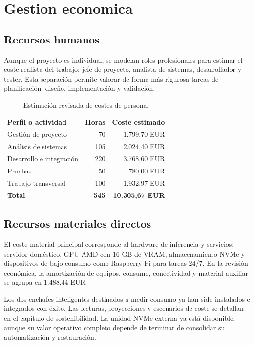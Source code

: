 \chapter{Gestion economica}

\section{Recursos humanos}
Aunque el proyecto es individual, se modelan roles profesionales para estimar el coste realista del trabajo: jefe de proyecto, analista de sistemas, desarrollador y tester. Esta separación permite valorar de forma más rigurosa tareas de planificación, diseño, implementación y validación.

\begin{table}[H]
  \centering
  \caption{Estimación revisada de costes de personal}
  \label{tab:costes-personal}
  \begin{tabular}{lrr}
    \toprule
    Perfil o actividad & Horas & Coste estimado \\
    \midrule
    Gestión de proyecto & 70 & 1.799,70 EUR \\
    Análisis de sistemas & 105 & 2.024,40 EUR \\
    Desarrollo e integración & 220 & 3.768,60 EUR \\
    Pruebas & 50 & 780,00 EUR \\
    Trabajo transversal & 100 & 1.932,97 EUR \\
    \midrule
    \textbf{Total} & \textbf{545} & \textbf{10.305,67 EUR} \\
    \bottomrule
  \end{tabular}
\end{table}

\section{Recursos materiales directos}
El coste material principal corresponde al hardware de inferencia y servicios: servidor doméstico, GPU AMD con 16 GB de VRAM, almacenamiento NVMe y dispositivos de bajo consumo como Raspberry Pi para tareas 24/7. En la revisión económica, la amortización de equipos, consumo, conectividad y material auxiliar se agrupa en 1.488,44 EUR.

Los dos enchufes inteligentes destinados a medir consumo ya han sido instalados e integrados con éxito. Las lecturas, proyecciones y escenarios de coste se detallan en el capítulo de sostenibilidad. La unidad NVMe externa ya está disponible, aunque su valor operativo completo depende de terminar de consolidar su automatización y restauración.

